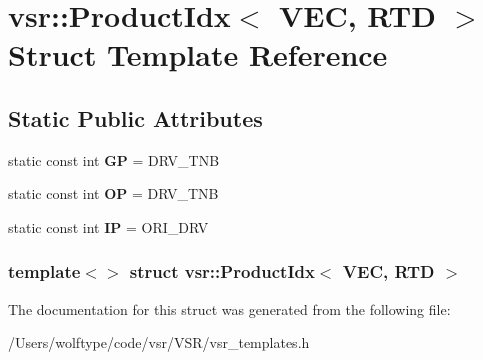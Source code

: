 \hypertarget{structvsr_1_1_product_idx_3_01_v_e_c_00_01_r_t_d_01_4}{\section{vsr\-:\-:Product\-Idx$<$ V\-E\-C, R\-T\-D $>$ Struct Template Reference}
\label{structvsr_1_1_product_idx_3_01_v_e_c_00_01_r_t_d_01_4}
}
\subsection*{Static Public Attributes}
\begin{DoxyCompactItemize}
\item 
\hypertarget{structvsr_1_1_product_idx_3_01_v_e_c_00_01_r_t_d_01_4_a80c2ec3e44588a81e1e79824ae003768}{static const int {\bfseries G\-P} = D\-R\-V\-\_\-\-T\-N\-B}\label{structvsr_1_1_product_idx_3_01_v_e_c_00_01_r_t_d_01_4_a80c2ec3e44588a81e1e79824ae003768}

\item 
\hypertarget{structvsr_1_1_product_idx_3_01_v_e_c_00_01_r_t_d_01_4_af4f24988e7d18ef5a56b49e943767fb2}{static const int {\bfseries O\-P} = D\-R\-V\-\_\-\-T\-N\-B}\label{structvsr_1_1_product_idx_3_01_v_e_c_00_01_r_t_d_01_4_af4f24988e7d18ef5a56b49e943767fb2}

\item 
\hypertarget{structvsr_1_1_product_idx_3_01_v_e_c_00_01_r_t_d_01_4_a7864acd0b43088d876e4c4fcaad8c7f7}{static const int {\bfseries I\-P} = O\-R\-I\-\_\-\-D\-R\-V}\label{structvsr_1_1_product_idx_3_01_v_e_c_00_01_r_t_d_01_4_a7864acd0b43088d876e4c4fcaad8c7f7}

\end{DoxyCompactItemize}
\subsubsection*{template$<$$>$ struct vsr\-::\-Product\-Idx$<$ V\-E\-C, R\-T\-D $>$}



The documentation for this struct was generated from the following file\-:\begin{DoxyCompactItemize}
\item 
/\-Users/wolftype/code/vsr/\-V\-S\-R/vsr\-\_\-templates.\-h\end{DoxyCompactItemize}
